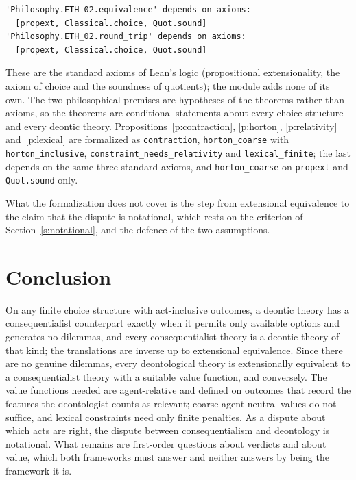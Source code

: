 \documentclass{situationist-preprint}
\begin{document}
\begin{lstlisting}
'Philosophy.ETH_02.equivalence' depends on axioms:
  [propext, Classical.choice, Quot.sound]
'Philosophy.ETH_02.round_trip' depends on axioms:
  [propext, Classical.choice, Quot.sound]
\end{lstlisting}

These are the standard axioms of Lean's logic (propositional extensionality, the axiom of choice and the soundness of quotients); the module adds none of its own. The two philosophical premises are hypotheses of the theorems rather than axioms, so the theorems are conditional statements about every choice structure and every deontic theory. Propositions~\ref{p:contraction}, \ref{p:horton}, \ref{p:relativity} and~\ref{p:lexical} are formalized as \texttt{contraction}, \texttt{horton\_coarse} with \texttt{horton\_inclusive}, \texttt{constraint\_needs\_relativity} and \texttt{lexical\_finite}; the last depends on the same three standard axioms, and \texttt{horton\_coarse} on \texttt{propext} and \texttt{Quot.sound} only.

What the formalization does not cover is the step from extensional equivalence to the claim that the dispute is notational, which rests on the criterion of Section~\ref{s:notational}, and the defence of the two assumptions.

\section{Conclusion}

On any finite choice structure with act-inclusive outcomes, a deontic theory has a consequentialist counterpart exactly when it permits only available options and generates no dilemmas, and every consequentialist theory is a deontic theory of that kind; the translations are inverse up to extensional equivalence. Since there are no genuine dilemmas, every deontological theory is extensionally equivalent to a consequentialist theory with a suitable value function, and conversely. The value functions needed are agent-relative and defined on outcomes that record the features the deontologist counts as relevant; coarse agent-neutral values do not suffice, and lexical constraints need only finite penalties. As a dispute about which acts are right, the dispute between consequentialism and deontology is notational. What remains are first-order questions about verdicts and about value, which both frameworks must answer and neither answers by being the framework it is.
\end{document}
